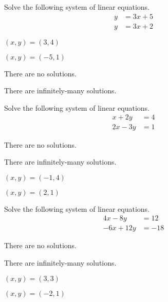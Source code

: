\begin{readinessAssuranceTest}
\item Solve the following system of linear equations.
      \begin{align*}
      y   &=  3x+5 \\
      y  &=  3x+2
      \end{align*}

\begin{multicols}{4}
\begin{readinessAssuranceTestChoices}
\item
\((x,y)=(3,4)\)
\item
\((x,y)=(-5,1)\)
\item There are no solutions. %
\item There are infinitely-many solutions.
\end{readinessAssuranceTestChoices}
\end{multicols}


\item Solve the following system of linear equations.
      \begin{align*}
      x+2y   &=   4 \\
      2x-3y  &=  1
      \end{align*}

\begin{multicols}{4}
\begin{readinessAssuranceTestChoices}
\item There are no solutions.
\item There are infinitely-many solutions.
\item
\((x,y)=(-1,4)\)
\item
\((x,y)=(2,1)\) %
\end{readinessAssuranceTestChoices}
\end{multicols}


\item Solve the following system of linear equations.
      \begin{align*}
      4x-8y   &= 12 \\
      -6x+12y  &=  -18
      \end{align*}

\begin{multicols}{4}
\begin{readinessAssuranceTestChoices}
\item There are no solutions.
\item There are infinitely-many solutions. %
\item
\((x,y)=(3,3)\)
\item
\((x,y)=(-2,1)\)
\end{readinessAssuranceTestChoices}
\end{multicols}

\end{readinessAssuranceTest}
